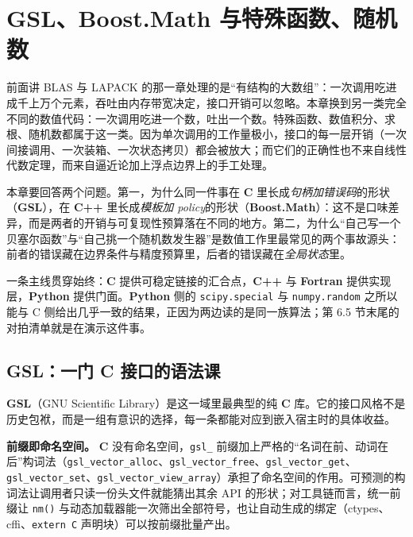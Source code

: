 \documentclass[12pt,a4paper,fontset=fandol]{ctexbook}
\newcommand{\Fn}[1]{\texttt{#1()}}
\newcommand{\Tp}[1]{\texttt{#1}}
\newcommand{\Bk}{\allowbreak}
\newcommand{\Lib}[1]{\textbf{#1}}
\newcommand{\Lang}[1]{\textsf{\bfseries #1}}
\newcommand{\CL}{\Lang{C}}
\newcommand{\CPP}{\Lang{C++}}
\newcommand{\FTN}{\Lang{Fortran}}
\newcommand{\PY}{\Lang{Python}}
\begin{document}
\chapter{GSL、Boost.Math 与特殊函数、随机数}

前面讲 BLAS 与 LAPACK 的那一章处理的是``有结构的大数组''：一次调用吃进成千上万个元素，吞吐由内存带宽决定，接口开销可以忽略。本章换到另一类完全不同的数值代码：一次调用吃进一个数，吐出一个数。特殊函数、数值积分、求根、随机数都属于这一类。因为单次调用的工作量极小，接口的每一层开销（一次间接调用、一次装箱、一次状态拷贝）都会被放大；而它们的正确性也不来自线性代数定理，而来自逼近论加上浮点边界上的手工处理。

本章要回答两个问题。第一，为什么同一件事在 \CL{} 里长成\emph{句柄加错误码}的形状（\Lib{GSL}），在 \CPP{} 里长成\emph{模板加 policy}的形状（\Lib{Boost.Math}）：这不是口味差异，而是两者的开销与可复现性预算落在不同的地方。第二，为什么``自己写一个贝塞尔函数''与``自己挑一个随机数发生器''是数值工作里最常见的两个事故源头：前者的错误藏在边界条件与精度预算里，后者的错误藏在\emph{全局状态}里。

一条主线贯穿始终：\CL{} 提供可稳定链接的汇合点，\CPP{} 与 \FTN{} 提供实现层，\PY{} 提供门面。\PY{} 侧的 \Tp{scipy.special} 与 \Tp{numpy.random} 之所以能与 C 侧给出几乎一致的结果，正因为两边读的是同一族算法；第 6.5 节末尾的对拍清单就是在演示这件事。

\section{\Lib{GSL}：一门 \CL{} 接口的语法课}

\Lib{GSL}（GNU Scientific Library）是这一域里最典型的纯 \CL{} 库。它的接口风格不是历史包袱，而是一组有意识的选择，每一条都能对应到嵌入宿主时的具体收益。

\textbf{前缀即命名空间。} \CL{} 没有命名空间，\Tp{gsl\_} 前缀加上严格的``名词在前、动词在后''构词法（\Tp{gsl\_vector\Bk\_alloc}、\Tp{gsl\_vector\Bk\_free}、\Tp{gsl\_vector\Bk\_get}、\Tp{gsl\_vector\Bk\_set}、\Tp{gsl\_vector\Bk\_view\Bk\_array}）承担了命名空间的作用。可预测的构词法让调用者只读一份头文件就能猜出其余 API 的形状；对工具链而言，统一前缀让 \Fn{nm} 与动态加载器能一次筛出全部符号，也让自动生成的绑定（ctypes、cffi、\Tp{extern \textquotedbl C\textquotedbl} 声明块）可以按前缀批量产出。
\end{document}
